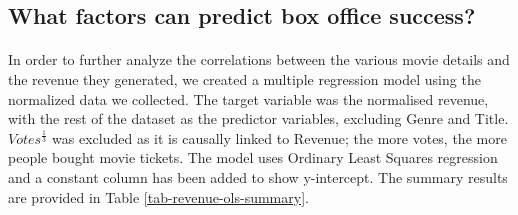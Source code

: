     \subsection*{}
        \paragraph{}

    \subsection{What factors can predict box office success?}
        \paragraph{}
        In order to further analyze the correlations between the various movie details
        and the revenue they generated, we created a multiple regression model using the
        normalized data we collected. 
        The target variable was the normalised revenue, with the rest of the dataset as the 
            predictor variables, excluding Genre and Title.
        $Votes^\frac{1}{3}$ was excluded as it is causally linked to Revenue; the more votes, the more people bought movie tickets. 
        The model uses Ordinary Least Squares regression and a constant column has been added to show y-intercept.
        The summary results are provided in Table \ref{tab-revenue-ols-summary}.
